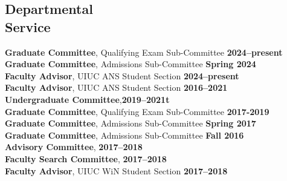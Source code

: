 \documentclass[margin,line]{resume}
\begin{document}
\begin{resume}
    \section{\mysidestyle Departmental\\Service}
                \textbf{Graduate Committee}, Qualifying Exam Sub-Committee \hfill \textbf{2024--present}\vspace{.5mm}\\%
                \textbf{Graduate Committee}, Admissions Sub-Committee \hfill \textbf{Spring 2024}\vspace{.5mm}\\%
                \textbf{Faculty Advisor}, UIUC ANS Student Section \hfill \textbf{2024--present}\vspace{.5mm}\\%
                \textbf{Faculty Advisor}, UIUC ANS Student Section \hfill \textbf{2016--2021}\vspace{.5mm}\\%
                \textbf{Undergraduate Committee},\hfill \textbf{2019--2021t}\vspace{.5mm}\\%
                \textbf{Graduate Committee}, Qualifying Exam Sub-Committee \hfill \textbf{2017-2019}\vspace{.5mm}\\%
                \textbf{Graduate Committee}, Admissions Sub-Committee \hfill \textbf{Spring 2017}\vspace{.5mm}\\%
                \textbf{Graduate Committee}, Admissions Sub-Committee \hfill \textbf{Fall 2016}\vspace{.5mm}\\%
                \textbf{Advisory Committee}, \hfill \textbf{2017--2018}\vspace{.5mm}\\%
                \textbf{Faculty Search Committee}, \hfill \textbf{2017--2018}\vspace{.5mm}\\%
                \textbf{Faculty Advisor}, UIUC WiN Student Section \hfill \textbf{2017--2018}\vspace{.5mm}\\%

\end{resume}
\end{document}
